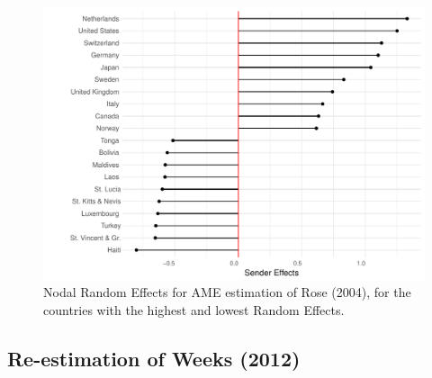 \begin{figure}
	\includegraphics[width=\textwidth]{rose_aeff_top10.pdf}
	\caption{Nodal Random Effects for AME estimation of Rose (2004), for the countries with the highest and lowest Random Effects.}\label{fig:roser}
\end{figure}
\FloatBarrier

\subsection{Re-estimation of Weeks (2012)}

